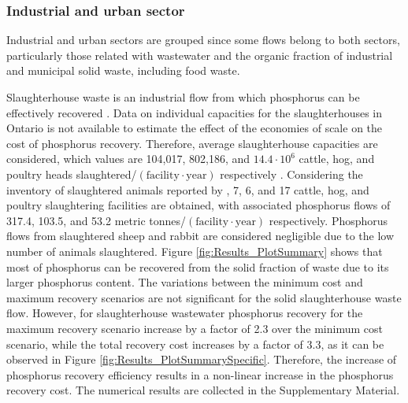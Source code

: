 \documentclass[authoryear]{elsarticle}
\begin{document}
\subsubsection{Industrial and urban sector}
Industrial and urban sectors are grouped since some flows belong to both sectors, particularly those related with wastewater and the organic fraction of industrial and municipal solid waste, including food waste.

Slaughterhouse waste is an industrial flow from which phosphorus can be effectively recovered \citep{Pearl2Kcost2}. Data on individual capacities for the slaughterhouses in Ontario is not available to estimate the effect of the economies of scale on the cost of phosphorus recovery. Therefore, average slaughterhouse capacities are considered, which values are 104,017, 802,186, and $14.4 \cdot 10^6$ cattle, hog, and poultry heads slaughtered/$\left(\text{facility} \cdot \text{year}\right) $ respectively \citep{SlaughterhouseDistribution, SlaughterhousePoultryAverageSize}. Considering the inventory of slaughtered animals reported by \citet{SlaughterFederalRedMeat, SlaughterFederalPoultry}, 7, 6, and 17 cattle, hog, and poultry slaughtering facilities are obtained, with associated phosphorus flows of 317.4, 103.5, and 53.2 metric tonnes/$\left(\text{facility} \cdot \text{year}\right) $ respectively. Phosphorus flows from slaughtered sheep and rabbit are considered negligible due to the low number of animals slaughtered. Figure \ref{fig:Results_PlotSummary} shows that most of phosphorus can be recovered from the solid fraction of waste due to its larger phosphorus content. The variations between the minimum cost and maximum recovery scenarios are not significant for the solid slaughterhouse waste flow. However, for slaughterhouse wastewater phosphorus recovery for the maximum recovery scenario increase by a factor of 2.3  over the minimum cost scenario, while the total recovery cost increases by a factor of 3.3, as it can be observed in Figure \ref{fig:Results_PlotSummarySpecific}. Therefore, the increase of phosphorus recovery efficiency results in a non-linear increase in the phosphorus recovery cost. The numerical results are collected in the Supplementary Material.
\end{document}
